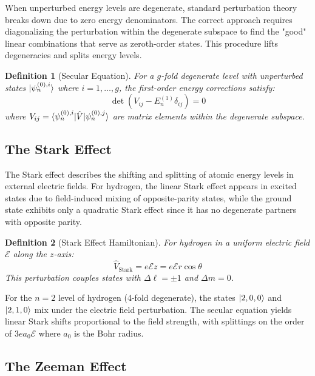 \documentclass[a4paper, 11pt]{article}
\newtheorem{definition}{Definition}[section]
\begin{document}
When unperturbed energy levels are degenerate, standard perturbation theory
breaks down due to zero energy denominators. The correct approach requires
diagonalizing the perturbation within the degenerate subspace to find the
"good" linear combinations that serve as zeroth-order states. This procedure
lifts degeneracies and splits energy levels.

\begin{definition}[Secular Equation]
For a $g$-fold degenerate level with unperturbed states $\ket{\psi_n^{(0),i}}$
where $i = 1, \ldots, g$, the first-order energy corrections satisfy:
\begin{equation}
\det\left( V_{ij} - E_n^{(1)} \delta_{ij} \right) = 0
\end{equation}
where $V_{ij} = \braket{\psi_n^{(0),i} | \hat{V} | \psi_n^{(0),j}}$ are matrix
elements within the degenerate subspace.
\end{definition}

\subsection{The Stark Effect}

The Stark effect describes the shifting and splitting of atomic energy levels
in external electric fields. For hydrogen, the linear Stark effect appears in
excited states due to field-induced mixing of opposite-parity states, while
the ground state exhibits only a quadratic Stark effect since it has no
degenerate partners with opposite parity.

\begin{definition}[Stark Effect Hamiltonian]
For hydrogen in a uniform electric field $\mathcal{E}$ along the $z$-axis:
\begin{equation}
\hat{V}_{\text{Stark}} = e \mathcal{E} z = e \mathcal{E} r \cos\theta
\end{equation}
This perturbation couples states with $\Delta \ell = \pm 1$ and $\Delta m = 0$.
\end{definition}

For the $n=2$ level of hydrogen (4-fold degenerate), the states $\ket{2,0,0}$
and $\ket{2,1,0}$ mix under the electric field perturbation. The secular
equation yields linear Stark shifts proportional to the field strength, with
splittings on the order of $3 e a_0 \mathcal{E}$ where $a_0$ is the Bohr radius.

\subsection{The Zeeman Effect}
\end{document}

